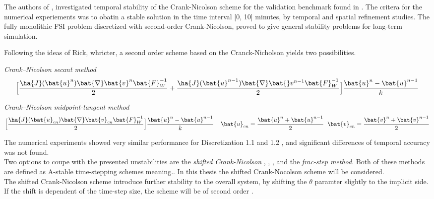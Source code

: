 The authors of \cite{Richter2015}, investigated temporal stability of the Crank-Nicolson scheme for the validation benchmark found in \cite{Hron2006}.  
The critera for the numerical experiements was to obatin a stable solution in the time interval [0, 10] minutes, by temporal and spatial refinement studies. The fully monolithic FSI problem discretized with second-order Crank-Nicolson, proved to give general stability problems for long-term simulation. 

Following the ideas of Rick, whricter, a second order scheme based on the Cranck-Nicholson yields two possibilities.
\begin{discr}
\textit{Crank–Nicolson secant method }
\begin{align*}
\Big[\frac{\ha{J}(\bat{u}^{n}) \bat{\nabla} \bat{v}^{n} \bat{F}_W^{-1}}{2} 
+ \frac{\ha{J}(\bat{u}^{n-1}) \bat{\nabla} \bat{}v^{n-1} \bat{F}_W^{-1}}{2} \Big] 
\frac{\bat{u}^{n} - \bat{u}^{n-1}}{k}
\end{align*} 
\end{discr}

\begin{discr}
\textit{Crank–Nicolson midpoint-tangent method}
\begin{align*}
\Big[\frac{\ha{J}(\bat{u}_{cn}) \bat{\nabla} \bat{v}_{cn} \bat{F}_W^{-1}}{2} \Big] 
\frac{\bat{u}^{n} - \bat{u}^{n-1}}{k} \hspace{4mm}
\bat{u}_{cn} = \frac{\bat{u}^{n} + \bat{u}^{n-1}}{2} \hspace{2mm}
\bat{v}_{cn} = \frac{\bat{v}^{n} + \bat{v}^{n-1}}{2}
\end{align*} 
\end{discr}

The numerical experiments showed very similar performance for Discretization 1.1 and 1.2 , and significant differences of temporal accuracy was not found. \\
Two options to coupe with the presented unstabilities are the \textit{shifted Crank-Nicolson} \cite{Richter2015}, \cite{Wicka}, \cite{Wick2013a},   and the \textit{frac-step method}. Both of these methods are defined as A-stable time-stepping schemes meaning..  In this thesis the shifted Crank-Nocolson scheme will be considered. \\
The shifted Crank-Nicolson scheme introduce further stability to the overall system, by shifting the $\theta$ paramter slightly to the implicit side. If the shift is dependent of the time-step size, the scheme will be of second order \cite{Richter2015}.


